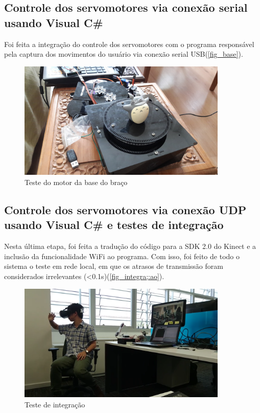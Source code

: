 \subsection{Controle dos servomotores via conexão serial usando Visual C\#}\label{subsec-VisualCsharpcontrol}
Foi feita a integração do controle dos servomotores com o programa responsável pela captura dos movimentos do usuário via conexão serial USB(\autoref{fig_base}). \par
\begin{figure}[h!]
	\caption{\label{fig_base}  Teste do motor da base do braço}
	\begin{center}
		\includegraphics[width=100mm]{20161101_110237.jpg}	
	\end{center}
\end{figure}
\subsection{Controle dos servomotores via conexão UDP usando Visual C\# e testes de integração}\label{subsec-all}
Nesta última etapa, foi feita a tradução do código para a SDK 2.0 do Kinect e a inclusão da funcionalidade WiFi ao programa. Com isso, foi feito de todo o sistema o teste em rede local, em que os atrasos de transmissão foram considerados irrelevantes (<0.1s)(\autoref{fig_integra;:ao}).\par
		\begin{figure}[h!]
			\caption{\label{fig_integrated}  Teste de integração}
			\begin{center}
				\includegraphics[width=100mm]{integrated.png}	
			\end{center}
		\end{figure}

